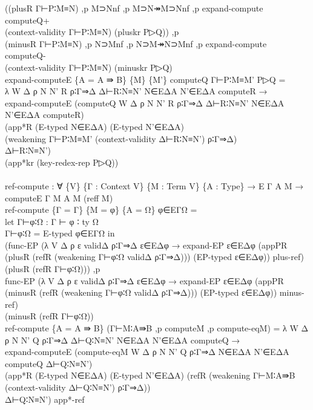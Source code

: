 {\begin{code}
{\>  ((plusR Γ⊢P∶M≡N) ,p M⊃Nnf ,p M⊃N↠M⊃Nnf ,p expand-compute computeQ+ \<\\
\>    (context-validity Γ⊢P∶M≡N) (pluskr P▷Q)) ,p \<\\
\>  (minusR Γ⊢P∶M≡N) ,p N⊃Mnf ,p N⊃M↠N⊃Mnf ,p expand-compute computeQ- \<\\
\>    (context-validity Γ⊢P∶M≡N) (minuskr P▷Q)\<\\
\>expand-computeE \{A = A ⇛ B\} \{M\} \{M'\} computeQ Γ⊢P∶M≡M' P▷Q = \<\\
\>  λ W Δ ρ N N' R ρ∶Γ⇒Δ Δ⊢R∶N≡N' N∈EΔA N'∈EΔA computeR → \<\\
\>  expand-computeE (computeQ W Δ ρ N N' R ρ∶Γ⇒Δ Δ⊢R∶N≡N' N∈EΔA N'∈EΔA computeR) \<\\
\>  (app*R (E-typed N∈EΔA) (E-typed N'∈EΔA) \<\\
\>    (weakening Γ⊢P∶M≡M' (context-validity Δ⊢R∶N≡N') ρ∶Γ⇒Δ)\<\\
\>    Δ⊢R∶N≡N')\<\\
\>  (app*kr (key-redex-rep P▷Q))\<\\
\>\<\\
\>ref-compute : ∀ \{V\} \{Γ : Context V\} \{M : Term V\} \{A : Type\} → E Γ A M → computeE Γ M A M (reff M)\<\\
\>ref-compute \{Γ = Γ\} \{M = φ\} \{A = Ω\} φ∈EΓΩ = \<\\
\>  let Γ⊢φ∶Ω : Γ ⊢ φ ∶ ty Ω\<\\
\>      Γ⊢φ∶Ω = E-typed φ∈EΓΩ in\<\\
\>  (func-EP (λ V Δ ρ ε validΔ ρ∶Γ⇒Δ ε∈EΔφ → expand-EP ε∈EΔφ (appPR (plusR (refR (weakening Γ⊢φ∶Ω validΔ ρ∶Γ⇒Δ))) (EP-typed ε∈EΔφ)) plus-ref) \<\\
\>  (plusR (refR Γ⊢φ∶Ω))) ,p \<\\
\>  func-EP (λ V Δ ρ ε validΔ ρ∶Γ⇒Δ ε∈EΔφ → expand-EP ε∈EΔφ (appPR (minusR (refR (weakening Γ⊢φ∶Ω validΔ ρ∶Γ⇒Δ))) (EP-typed ε∈EΔφ)) minus-ref) \<\\
\>  (minusR (refR Γ⊢φ∶Ω))\<\\
\>ref-compute \{A = A ⇛ B\} (Γ⊢M∶A⇛B ,p computeM ,p compute-eqM) = λ W Δ ρ N N' Q ρ∶Γ⇒Δ Δ⊢Q∶N≡N' N∈EΔA N'∈EΔA computeQ → \<\\
\>  expand-computeE (compute-eqM W Δ ρ N N' Q ρ∶Γ⇒Δ N∈EΔA N'∈EΔA computeQ Δ⊢Q∶N≡N') \<\\
\>    (app*R (E-typed N∈EΔA) (E-typed N'∈EΔA) (refR (weakening Γ⊢M∶A⇛B (context-validity Δ⊢Q∶N≡N') ρ∶Γ⇒Δ)) \<\\
\>      Δ⊢Q∶N≡N') app*-ref\<\\
\>\<\\
}
\end{code}}
